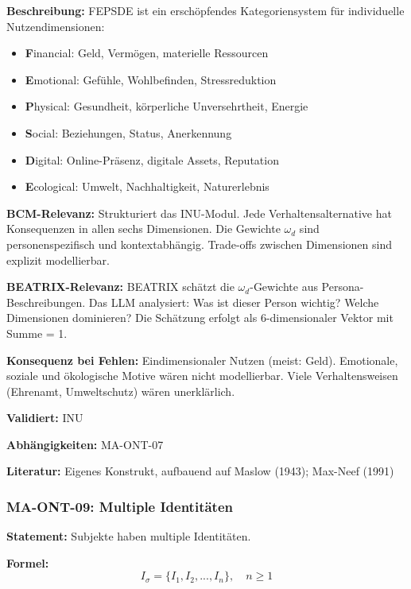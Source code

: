 \textbf{Beschreibung:}
FEPSDE ist ein erschöpfendes Kategoriensystem für individuelle Nutzendimensionen:
\begin{itemize}
    \item \textbf{F}inancial: Geld, Vermögen, materielle Ressourcen
    \item \textbf{E}motional: Gefühle, Wohlbefinden, Stressreduktion
    \item \textbf{P}hysical: Gesundheit, körperliche Unversehrtheit, Energie
    \item \textbf{S}ocial: Beziehungen, Status, Anerkennung
    \item \textbf{D}igital: Online-Präsenz, digitale Assets, Reputation
    \item \textbf{E}cological: Umwelt, Nachhaltigkeit, Naturerlebnis
\end{itemize}

\textbf{BCM-Relevanz:}
Strukturiert das INU-Modul. Jede Verhaltensalternative hat Konsequenzen in allen sechs Dimensionen. Die Gewichte $\omega_d$ sind personenspezifisch und kontextabhängig. Trade-offs zwischen Dimensionen sind explizit modellierbar.

\textbf{BEATRIX-Relevanz:}
BEATRIX schätzt die $\omega_d$-Gewichte aus Persona-Beschreibungen. Das LLM analysiert: Was ist dieser Person wichtig? Welche Dimensionen dominieren? Die Schätzung erfolgt als 6-dimensionaler Vektor mit Summe = 1.

\textbf{Konsequenz bei Fehlen:}
Eindimensionaler Nutzen (meist: Geld). Emotionale, soziale und ökologische Motive wären nicht modellierbar. Viele Verhaltensweisen (Ehrenamt, Umweltschutz) wären unerklärlich.

\textbf{Validiert:} INU

\textbf{Abhängigkeiten:} MA-ONT-07

\textbf{Literatur:} Eigenes Konstrukt, aufbauend auf Maslow (1943); Max-Neef (1991)


\subsubsection*{MA-ONT-09: Multiple Identitäten}

\textbf{Statement:} Subjekte haben multiple Identitäten.

\textbf{Formel:}
\begin{equation}
I_\sigma = \{I_1, I_2, ..., I_n\}, \quad n \geq 1
\end{equation}

